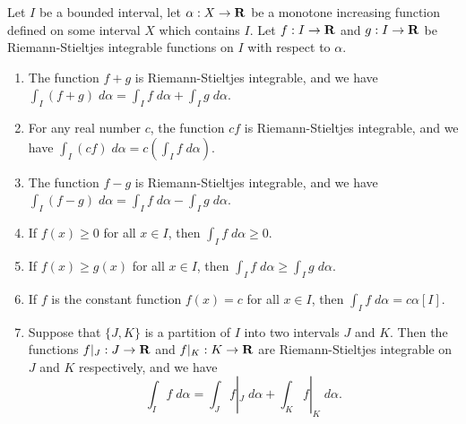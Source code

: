 \begin{additional corollary}\label{ac 11.8.11}
Let \(I\) be a bounded interval, let \(\alpha : X \to \mathbf{R}\) be a monotone increasing function defined on some interval \(X\) which contains \(I\).
Let \(f : I \to \mathbf{R}\) and \(g : I \to \mathbf{R}\) be Riemann-Stieltjes integrable functions on \(I\) with respect to \(\alpha\).
\begin{enumerate}
    \item The function \(f + g\) is Riemann-Stieltjes integrable, and we have \(\int_I (f + g) \; d \alpha = \int_I f \; d \alpha + \int_I g \; d \alpha\).
    \item For any real number \(c\), the function \(cf\) is Riemann-Stieltjes integrable, and we have \(\int_I (cf) \; d \alpha = c(\int_I f \; d \alpha)\).
    \item The function \(f - g\) is Riemann-Stieltjes integrable, and we have \(\int_I (f - g) \; d \alpha = \int_I f \; d \alpha - \int_I g \; d \alpha\).
    \item If \(f(x) \geq 0\) for all \(x \in I\), then \(\int_I f \; d \alpha \geq 0\).
    \item If \(f(x) \geq g(x)\) for all \(x \in I\), then \(\int_I f \; d \alpha \geq \int_I g \; d \alpha\).
    \item If \(f\) is the constant function \(f(x) = c\) for all \(x \in I\), then \(\int_I f \; d \alpha = c \alpha[I]\).
    \item Suppose that \(\{J, K\}\) is a partition of \(I\) into two intervals \(J\) and \(K\).
          Then the functions \(f|_J : J \to \mathbf{R}\) and \(f|_K : K \to \mathbf{R}\) are Riemann-Stieltjes integrable on \(J\) and \(K\) respectively, and we have
          \[
              \int_I f \; d \alpha = \int_J f|_J \; d \alpha + \int_K f|_K \; d \alpha.
          \]
\end{enumerate}
\end{additional corollary}


